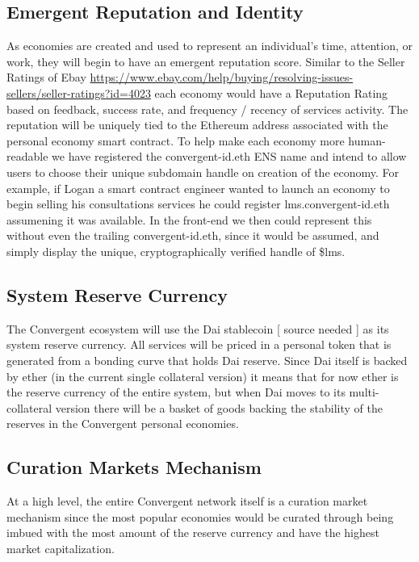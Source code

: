 \documentclass[a4paper]{article}
\begin{document}
\subsection{Emergent Reputation and Identity}

As economies are created and used to represent an individual’s time, attention, or work, they will begin to have an emergent reputation score. Similar to the Seller Ratings of Ebay \url{https://www.ebay.com/help/buying/resolving-issues-sellers/seller-ratings?id=4023} each economy would have a Reputation Rating based on feedback, success rate, and frequency / recency of services activity. The reputation will be uniquely tied to the Ethereum address associated with the personal economy smart contract. To help make each economy more human-readable we have registered the convergent-id.eth ENS name and intend to allow users to choose their unique subdomain handle on creation of the economy. For example, if Logan a smart contract engineer wanted to launch an economy to begin selling his consultations services he could register lms.convergent-id.eth assumening it was available. In the front-end we then could represent this without even the trailing convergent-id.eth, since it would be assumed, and simply display the unique, cryptographically verified handle of \$lms. 

\subsection{System Reserve Currency}

The Convergent ecosystem will use the Dai stablecoin [ source needed ] as its system reserve currency. All services will be priced in a personal token that is generated from a bonding curve that holds Dai reserve. Since Dai itself is backed by ether (in the current single collateral version) it means that for now ether is the reserve currency of the entire system, but when Dai moves to its multi-collateral version there will be a basket of goods backing the stability of the reserves in the Convergent personal economies.

\subsection{Curation Markets Mechanism}

At a high level, the entire Convergent network itself is a curation market mechanism since the most popular economies would be curated through being imbued with the most amount of the reserve currency and have the highest market capitalization. 
\end{document}
